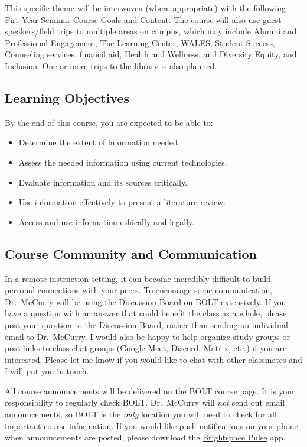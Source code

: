 \documentclass[11pt,letterpaper]{article}
\begin{document}
This specific theme will be interwoven (where appropriate) with the following
Firt Year Seminar Course Goals and Content. The course will also use guest
speakers/field trips to multiple areas on campus, which may include Alumni and
Professional Engagement, The Learning Center, WALES, Student Success, Counseling
services, financil aid, Health and Wellness, and Diversity Equity, and
Inclusion. One or more trips to the library is also planned.

\subsection{Learning Objectives}
By the end of this course, you are expected to be able to:
\begin{itemize}[noitemsep]
	\item Determine the extent of information needed.
	\item Assess the needed information using current technologies.
	\item Evaluate information and its sources critically.
	\item Use information effectively to present a literature review.
	\item Access and use information ethically and legally.
\end{itemize}

\subsection{Course Community and Communication}
In a remote instruction setting, it can become incredibly difficult to build
personal connections with your peers. To encourage some communication, Dr.\
McCurry will be using the Discussion Board on BOLT extensively. If you have a
question with an answer that could benefit the class as a whole, please post
your question to the Discussion Board, rather than sending an individual email
to Dr.\ McCurry. I would also be happy to help organize study groups or post
links to class chat groups (Google Meet, Discord, Matrix, etc.) if you are
interested. Please let me know if you would like to chat with other classmates
and I will put you in touch.

All course announcements will be delivered on the BOLT course page. It is your
responsibility to regularly check BOLT. Dr.\ McCurry will \emph{not} send out
email announcements, so BOLT is the \emph{only} location you will need to check
for all important course information. If you would like push notifications on
your phone when announcements are posted, please download the
\href{https://documentation.brightspace.com/EN/brightspace/requirements/all/pulse.htm}{Brightspace
Pulse} app.
\end{document}
